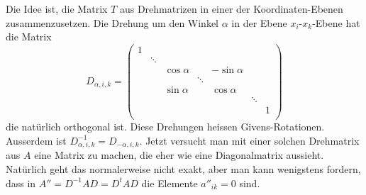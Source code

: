 Die Idee ist, die Matrix $T$ aus Drehmatrizen in einer der Koordinaten-Ebenen
zusammenzusetzen.
Die Drehung um den Winkel $\alpha$ in der Ebene
$x_i$-$x_k$-Ebene hat die Matrix
\begin{equation}
D_{\alpha,i,k}=\begin{pmatrix}
1     &      &           &      &           &      &      \\
      &\ddots&           &      &           &      &      \\
      &      & \cos\alpha&      &-\sin\alpha&      &      \\
      &      &           &\ddots&           &      &      \\
      &      & \sin\alpha&      & \cos\alpha&      &      \\
      &      &           &      &           &\ddots&      \\
      &      &           &      &           &      &1     \\
\end{pmatrix}
\label{matrixd}
\end{equation}
die natürlich orthogonal ist.
Diese Drehungen heissen Givens-Rotationen.
Ausserdem ist
$D_{\alpha,i,k}^{-1}=D_{-\alpha,i,k}$.
Jetzt versucht man mit
einer solchen Drehmatrix aus $A$ eine Matrix zu machen, die 
eher wie eine Diagonalmatrix aussieht.
Natürlich geht das
normalerweise nicht exakt, aber man kann wenigstens fordern,
dass in $A''= D^{-1}AD=D^tAD$ die Elemente $a''_{ik}=0$ sind.

